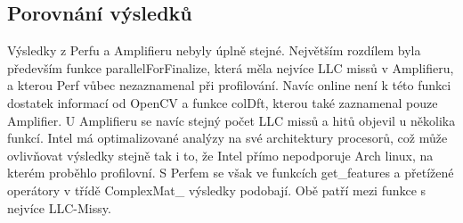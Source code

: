 \documentclass{article}
\begin{document}
\subsection{Porovnání výsledků}
Výsledky z Perfu a Amplifieru nebyly úplně stejné. Největším rozdílem byla především funkce parallelForFinalize, která měla nejvíce LLC missů v Amplifieru, a kterou Perf vůbec nezaznamenal při profilování. Navíc online není k této funkci dostatek informací od OpenCV a funkce colDft, kterou také zaznamenal pouze Amplifier. U Amplifieru se navíc stejný počet LLC missů a hitů objevil u několika funkcí. Intel má optimalizované analýzy na své architektury procesorů, což může ovlivňovat výsledky stejně tak i to, že Intel přímo nepodporuje Arch linux, na kterém proběhlo profilovní. S Perfem se však ve funkcích get\_features a přetížené operátory v třídě ComplexMat\_ výsledky podobají. Obě patří mezi funkce s nejvíce LLC-Missy.
\end{document}
